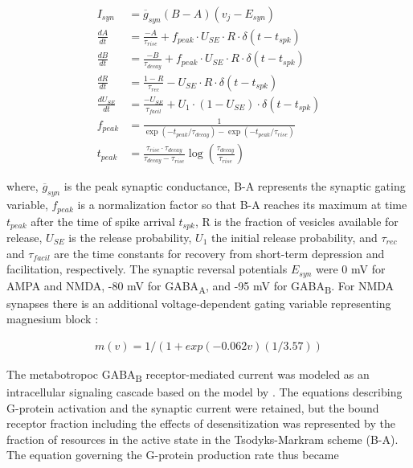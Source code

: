 \begin{align}
%
I_{syn} &= \overline{g}_{syn} (B - A) (v_j - E_{syn}) \label{eq:tm-synapse-start} \\
\frac{dA}{dt} &= \frac{-A}{\tau_{rise}} + f_{peak} \cdot U_{SE} \cdot R \cdot \delta (t - t_{spk}) \\
\frac{dB}{dt} &= \frac{-B}{\tau_{decay}} + f_{peak} \cdot U_{SE} \cdot R \cdot \delta (t - t_{spk}) \\
\frac{dR}{dt} &= \frac{1 - R}{\tau_{rec}} - U_{SE} \cdot R \cdot \delta (t - t_{spk}) \\
\frac{dU_{SE}}{dt} &= \frac{-U_{SE}}{\tau_{facil}} + U_{1} \cdot ( 1 - U_{SE} ) \cdot \delta (t - t_{spk}) \\
f_{peak} &= \frac{1}{\exp (-t_{peak} / \tau_{decay}) - \exp (-t_{peak} / \tau_{rise})} \\
t_{peak} &= \frac{\tau_{rise} \cdot \tau_{decay}}{\tau_{decay} - \tau_{rise}} \log ( \frac{ \tau_{decay} }{ \tau_{rise} } ) \label{eq:tm-synapse-end}
\end{align}

where, $\overline{g}_{syn}$ is the peak synaptic conductance, B-A represents the synaptic gating variable, $f_{peak}$ is a normalization factor so that B-A reaches its maximum at time $t_{peak}$ after the time of spike arrival $t_{spk}$, R is the fraction of vesicles available for release, $U_{SE}$ is the release probability, $U_1$ the initial release probability, and $\tau_{rec}$ and $\tau_{facil}$ are the time constants for recovery from short-term depression and facilitation, respectively. The synaptic reversal potentials $ E_{syn} $ were 0 mV for AMPA and NMDA, -80 mV for GABA\textsubscript{A}, and -95 mV for GABA\textsubscript{B}. For NMDA synapses there is an additional voltage-dependent gating variable representing magnesium block \cite{jahr_voltage_1990}:

\begin{align}
    m(v) = 1 / (1 + exp(-0.062 v) (1 / 3.57))
\end{align}

The metabotropoc GABA\textsubscript{B} receptor-mediated current was modeled as an intracellular signaling cascade based on the model by \cite{destexhe_g_1995}. The equations describing G-protein activation and the synaptic current were retained, but the bound receptor fraction including the effects of desensitization was represented by the fraction of resources in the active state in the Tsodyks-Markram scheme (B-A). The equation governing the G-protein production rate thus became


